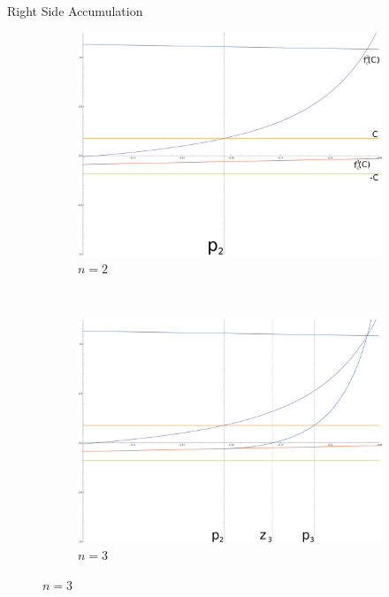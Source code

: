 \documentclass{beamer}
\newcommand{\<}{\left\langle}
\renewcommand{\>}{\right\rangle} %
\renewcommand{\*}{\cdot} %
\begin{document}
\begin{frame}[allowframebreaks]{Right Side Accumulation}
\begin{figure}[ht]
		\centering
		\begin{subfigure}[b]{0.5\textwidth}
				\includegraphics[width=\textwidth]{./img/cplot1H}
				\caption{$n = 2$}
				\label{fig:cplot1H}
		\end{subfigure}%
		~ %
		\begin{subfigure}[b]{0.5\textwidth}
				\includegraphics[width=\textwidth]{./img/cplot2H}
				\caption{$n=3$}
				\label{fig:cplot2H}
		\end{subfigure}

\end{figure}
\end{frame}
\end{document}

